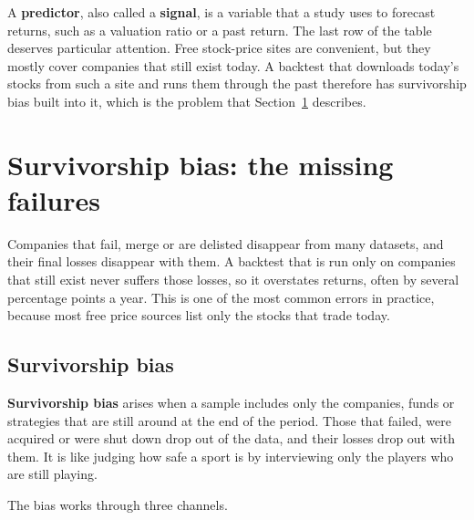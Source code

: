 A \textbf{predictor}, also called a \textbf{signal}, is a variable that a study uses to forecast returns, such as a valuation ratio or a past return. The last row of the table deserves particular attention. Free stock-price sites are convenient, but they mostly cover companies that still exist today. A backtest that downloads today's stocks from such a site and runs them through the past therefore has survivorship bias built into it, which is the problem that Section~\ref{sec:02-survivorship} describes.

\section{Survivorship bias: the missing failures}
\label{sec:02-survivorship}

Companies that fail, merge or are delisted disappear from many datasets, and their final losses disappear with them. A backtest that is run only on companies that still exist never suffers those losses, so it overstates returns, often by several percentage points a year. This is one of the most common errors in practice, because most free price sources list only the stocks that trade today.

\subsection{Survivorship bias}

\textbf{Survivorship bias} arises when a sample includes only the companies, funds or strategies that are still around at the end of the period. Those that failed, were acquired or were shut down drop out of the data, and their losses drop out with them. It is like judging how safe a sport is by interviewing only the players who are still playing.

The bias works through three channels.

